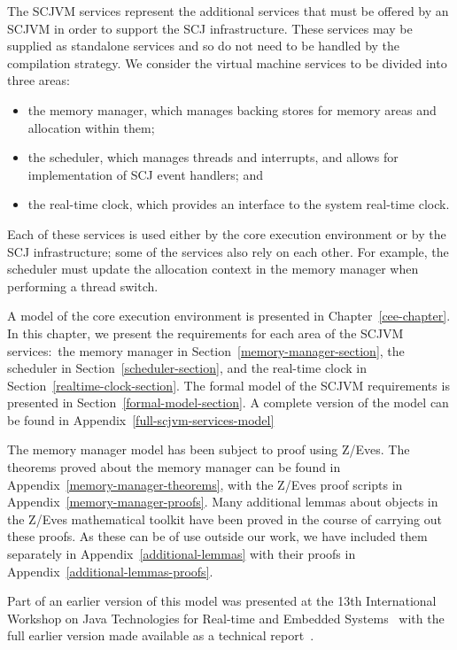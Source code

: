 The SCJVM services represent the additional services that must be
offered by an SCJVM in order to support the SCJ infrastructure.
These services may be supplied as standalone services and so do not
need to be handled by the compilation strategy.
We consider the virtual machine services to be divided into three
areas:
\begin{itemize}
\item the memory manager, which manages backing stores for memory areas and
  allocation within them;
\item the scheduler, which manages threads and interrupts, and allows for
  implementation of SCJ event handlers; and
\item the real-time clock, which provides an interface to the system real-time
  clock.
\end{itemize}
Each of these services is used either by the core execution environment or by
the SCJ infrastructure; some of the services also rely on each other.  For
example, the scheduler must update the allocation context in the memory manager
when performing a thread switch.

A model of the core execution environment is presented in
Chapter~\ref{cee-chapter}.
In this chapter, we present the requirements for each area of the
SCJVM services:~the memory manager in
Section~\ref{memory-manager-section}, the scheduler in
Section~\ref{scheduler-section}, and the real-time clock in
Section~\ref{realtime-clock-section}.
The formal model of the SCJVM requirements is presented in
Section~\ref{formal-model-section}.
A complete version of the model can be found in
Appendix~\ref{full-scjvm-services-model}

The memory manager model has been subject to proof using Z/Eves.
The theorems proved about the memory manager can be found in
Appendix~\ref{memory-manager-theorems}, with the Z/Eves proof scripts
in Appendix~\ref{memory-manager-proofs}.
Many additional lemmas about objects in the Z/Eves mathematical
toolkit have been proved in the course of carrying out these proofs.
As these can be of use outside our work, we have included them
separately in Appendix~\ref{additional-lemmas} with their proofs in
Appendix~\ref{additional-lemmas-proofs}.

Part of an earlier version of this model was presented at the 13th
International Workshop on Java Technologies for Real-time and Embedded
Systems~\cite{baxter2015a} with the full earlier version made available
as a technical report~\cite{baxter2015}.

